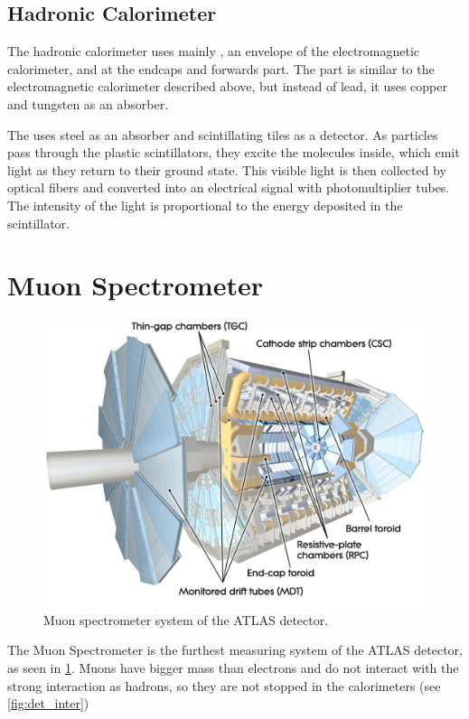 \subsection{Hadronic Calorimeter}
The hadronic calorimeter uses mainly \TCal, an envelope of the electromagnetic calorimeter, and \LAr at the endcaps and forwards part.
The \LAr part is similar to the electromagnetic calorimeter described above, but instead of lead, it uses copper and tungsten as an absorber.

The \TCal uses steel as an absorber and scintillating tiles as a detector.
As particles pass through the plastic scintillators, they excite the molecules inside, which emit light as they return to their ground state.
This visible light is then collected by optical fibers and converted into an electrical signal with photomultiplier tubes.
The intensity of the light is proportional to the energy deposited in the scintillator.




\section{Muon Spectrometer}
\label{sec:muon}
\begin{figure}[htb]
    \centering
    \includegraphics[width=0.8\linewidth]{src/img/muon.jpg}
    \caption{Muon spectrometer system of the ATLAS detector.}
    \label{fig:muon}
\end{figure}

The Muon Spectrometer is the furthest measuring system of the ATLAS detector, as seen in \cref{fig:muon}.
Muons have bigger mass than electrons and do not interact with the strong interaction as hadrons, so they are not stopped in the calorimeters (see \cref{fig:det_inter})

